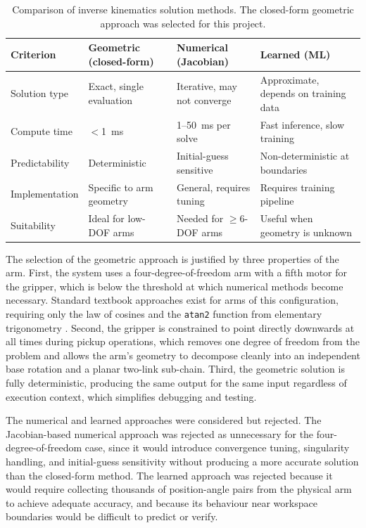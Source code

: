 \begin{table}[H]
    \centering
    \renewcommand{\arraystretch}{1.3}
    \begin{tabular}{|p{3.0cm}|p{3.5cm}|p{3.5cm}|p{3.5cm}|}
        \hline
        \textbf{Criterion} & \textbf{Geometric (closed-form)} & 
        \textbf{Numerical (Jacobian)} & \textbf{Learned (ML)} \\
        \hline
        Solution type & 
        Exact, single evaluation & 
        Iterative, may not converge & 
        Approximate, depends on training data \\
        \hline
        Compute time & 
        $<$1~ms & 
        1--50~ms per solve & 
        Fast inference, slow training \\
        \hline
        Predictability & 
        Deterministic & 
        Initial-guess sensitive & 
        Non-deterministic at boundaries \\
        \hline
        Implementation & 
        Specific to arm geometry & 
        General, requires tuning & 
        Requires training pipeline \\
        \hline
        Suitability & 
        Ideal for low-DOF arms & 
        Needed for $\geq$6-DOF arms & 
        Useful when geometry is unknown \\
        \hline
    \end{tabular}
    \caption{Comparison of inverse kinematics solution methods. The 
    closed-form geometric approach was selected for this project.}
    \label{tab:ik_methods}
\end{table}

The selection of the geometric approach is justified by three 
properties of the arm. First, the system uses a 
four-degree-of-freedom arm with a fifth motor for the gripper, 
which is below the threshold at which numerical methods become 
necessary. Standard textbook approaches 
exist for arms of this configuration, requiring only the law of 
cosines and the \texttt{atan2} function from elementary 
trigonometry \cite{craig2005}. Second, the gripper is constrained 
to point directly downwards at all times during pickup operations, 
which removes one degree of freedom from the problem and allows 
the arm's geometry to decompose cleanly into an independent base 
rotation and a planar two-link sub-chain. Third, the geometric 
solution is fully deterministic, producing the same output for 
the same input regardless of execution context, which simplifies 
debugging and testing.

The numerical and learned approaches were considered but rejected. 
The Jacobian-based numerical approach was rejected as unnecessary 
for the four-degree-of-freedom case, since it would introduce 
convergence tuning, singularity handling, and initial-guess 
sensitivity without producing a more accurate solution than the 
closed-form method. The learned approach was rejected because it 
would require collecting thousands of position-angle pairs from 
the physical arm to achieve adequate accuracy, and because its 
behaviour near workspace boundaries would be difficult to predict 
or verify.


